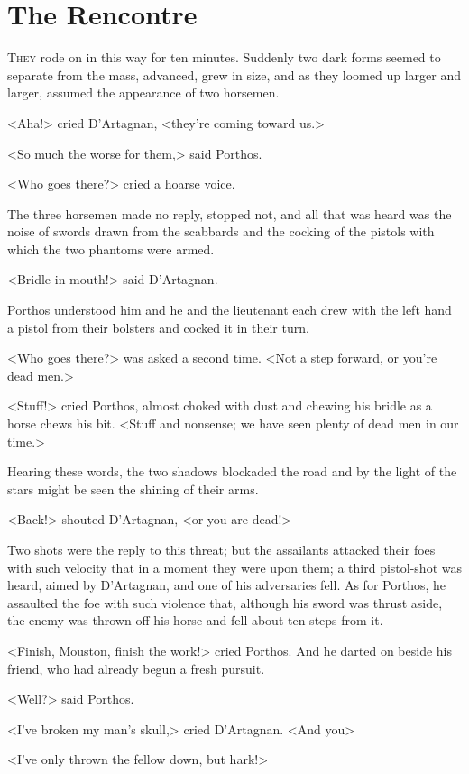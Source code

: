 \chapter{The Rencontre}

 \lettrine{T}{hey} rode on in this way for ten minutes. Suddenly two dark forms seemed to separate from the mass, advanced, grew in size, and as they loomed up larger and larger, assumed the appearance of two horsemen.

\zz
<Aha!> cried D'Artagnan, <they're coming toward us.>

<So much the worse for them,> said Porthos.

<Who goes there?> cried a hoarse voice.

The three horsemen made no reply, stopped not, and all that was heard was the noise of swords drawn from the scabbards and the cocking of the pistols with which the two phantoms were armed.

<Bridle in mouth!> said D'Artagnan.

Porthos understood him and he and the lieutenant each drew with the left hand a pistol from their bolsters and cocked it in their turn.

<Who goes there?> was asked a second time. <Not a step forward, or you're dead men.>

<Stuff!> cried Porthos, almost choked with dust and chewing his bridle as a horse chews his bit. <Stuff and nonsense; we have seen plenty of dead men in our time.>

Hearing these words, the two shadows blockaded the road and by the light of the stars might be seen the shining of their arms.

<Back!> shouted D'Artagnan, <or you are dead!>

Two shots were the reply to this threat; but the assailants attacked their foes with such velocity that in a moment they were upon them; a third pistol-shot was heard, aimed by D'Artagnan, and one of his adversaries fell. As for Porthos, he assaulted the foe with such violence that, although his sword was thrust aside, the enemy was thrown off his horse and fell about ten steps from it.

<Finish, Mouston, finish the work!> cried Porthos. And he darted on beside his friend, who had already begun a fresh pursuit.

<Well?> said Porthos.

<I've broken my man's skull,> cried D'Artagnan. <And you\longdash>

<I've only thrown the fellow down, but hark!>

